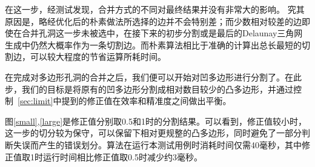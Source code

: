 在这一步，经测试发现，合并方式的不同对最终结果并没有非常大的影响。
究其原因是，略经优化后的朴素做法所选择的边并不会特别差；而少数相对较差的边即使在合并孔洞这一步未被选中，在接下来的初步分割或是最后的Delaunay三角网生成中仍然大概率作为一条切割边。而朴素算法相比于准确的计算出总长最短的切割边，可以较大程度的节省运算所耗时间。

在完成对多边形孔洞的合并之后，我们便可以开始对凹多边形进行分割了。在此步，我们的目标是将原有的凹多边形分割成相对数目较少的凸多边形，并通过控制~\ref*{sec:limit}中提到的修正值在效率和精准度之间做出平衡。

图\ref*{small},\ref*{large}是修正值分别取0.5和1时的分割结果。可以看到，修正值较小时，这一步的切分较为保守，可以保留下相对更规整的凸多边形，同时避免了一部分判断失误而产生的错误划分。算法在运行本测试用例时消耗时间仅需40毫秒，其中修正值取1时运行时间相比修正值取0.5时减少约3毫秒。

